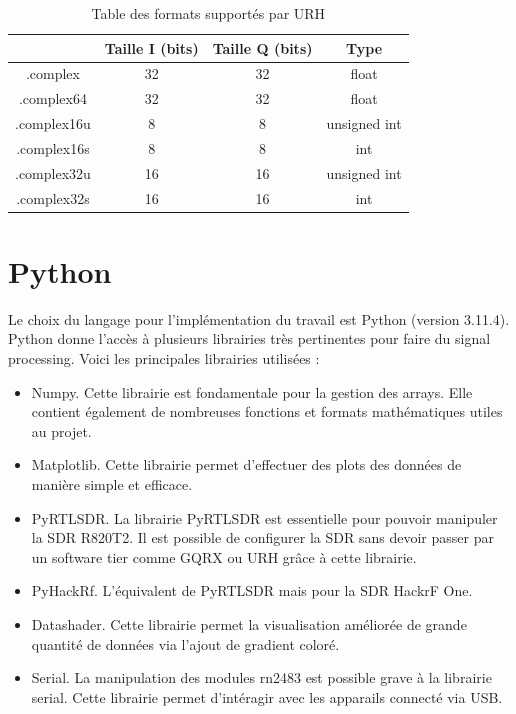 \begin{table}[h]
\centering
\begin{tabular}{|c|c|c|c|}
\hline
\multicolumn{1}{|c|}{} & \multicolumn{1}{c|}{Taille I (bits)} &\multicolumn{1}{c|}{Taille Q (bits)} & \multicolumn{1}{c|}{Type}\\
\hline
.complex & 32 & 32 & float \\
\hline
.complex64 & 32 & 32 & float\\
\hline
.complex16u & 8 & 8 & unsigned int\\
\hline
.complex16s &  8 & 8 & int\\
\hline
.complex32u & 16 & 16 & unsigned int \\
\hline
.complex32s & 16 & 16 & int  \\
\hline
\end{tabular}
\caption{Table des formats supportés par URH}
\label{format}
\end{table}



\section{Python}

Le choix du langage pour l'implémentation du travail est Python (version 3.11.4). Python donne l'accès à plusieurs librairies très pertinentes pour faire du signal processing. Voici les principales librairies utilisées :

\vspace{0.1cm}

\begin{itemize}
\item Numpy. Cette librairie est fondamentale pour la gestion des arrays. Elle contient également de nombreuses fonctions et formats mathématiques utiles au projet.
\item Matplotlib. Cette librairie permet d'effectuer des plots des données de manière simple et efficace.
\item PyRTLSDR. La librairie PyRTLSDR est essentielle pour pouvoir manipuler la \ac{SDR} R820T2. Il est possible de configurer la SDR sans devoir passer par un software tier comme GQRX ou URH grâce à cette librairie.
\item PyHackRf. L'équivalent de PyRTLSDR mais pour la SDR HackrF One.
\item Datashader. Cette librairie permet la visualisation améliorée de grande quantité de données via l'ajout de gradient coloré.
\item Serial. La manipulation des modules rn2483 est possible grave à la librairie serial. Cette librairie permet d'intéragir avec les apparails connecté via USB.
\end{itemize}

